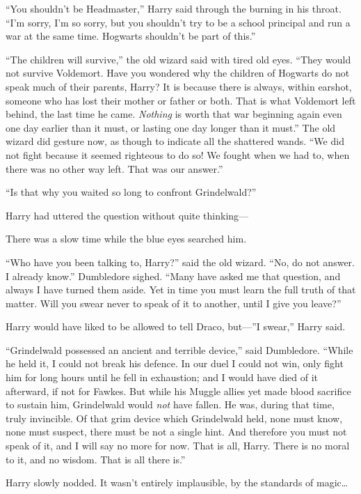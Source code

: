 “You shouldn’t be Headmaster,” Harry said through the burning in his throat.
“I’m sorry, I’m so sorry, but you shouldn’t try to be a school principal and
run a war at the same time. Hogwarts shouldn’t be part of this.”

“The children will survive,” the old wizard said with tired old eyes. “They
would not survive Voldemort. Have you wondered why the children of Hogwarts do
not speak much of their parents, Harry? It is because there is always, within
earshot, someone who has lost their mother or father or both. That is what
Voldemort left behind, the last time he came. \emph{Nothing} is worth that war
beginning again even one day earlier than it must, or lasting one day longer
than it must.” The old wizard did gesture now, as though to indicate all the
shattered wands. “We did not fight because it seemed righteous to do so! We
fought when we had to, when there was no other way left. That was our answer.”

“Is that why you waited so long to confront Grindelwald?”

Harry had uttered the question without quite thinking—

There was a slow time while the blue eyes searched him.

“Who have you been talking to, Harry?” said the old wizard. “No, do not answer.
I already know.” Dumbledore sighed. “Many have asked me that question, and
always I have turned them aside. Yet in time you must learn the full truth of
that matter. Will you swear never to speak of it to another, until I give you
leave?”

Harry would have liked to be allowed to tell Draco, but—”I swear,” Harry said.

“Grindelwald possessed an ancient and terrible device,” said Dumbledore. “While
he held it, I could not break his defence. In our duel I could not win, only
fight him for long hours until he fell in exhaustion; and I would have died of
it afterward, if not for Fawkes. But while his Muggle allies yet made blood
sacrifice to sustain him, Grindelwald would \emph{not} have fallen. He was,
during that time, truly invincible. Of that grim device which Grindelwald held,
none must know, none must suspect, there must be not a single hint. And
therefore you must not speak of it, and I will say no more for now. That is
all, Harry. There is no moral to it, and no wisdom. That is all there is.”

Harry slowly nodded. It wasn’t entirely implausible, by the standards of
magic…

